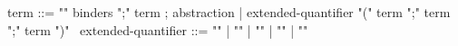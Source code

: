 \begin{syntax}
term ::= {"\lambda" binders ";" term} ; abstraction
| {extended-quantifier "(" term ";" term ";" term ")"}
\
extended-quantifier ::= {"\max"} | {"\min"} | {"\sum"} | {"\product"}
                      | {"\numof"}
\end{syntax}